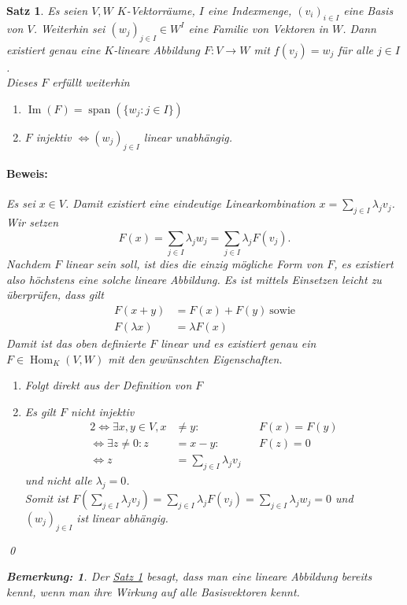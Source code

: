 \documentclass{report}
\newcommand{\lb}{\lambda}
\DeclareMathOperator{\Span}{span}
\DeclareMathOperator{\Hom}{Hom}
\DeclareMathOperator{\Ima}{Im}
\theoremstyle{customrem}
\newtheorem*{bemerkung}{Bemerkung\textnormal:}
\theoremstyle{customdef}
\newtheorem{satz}[definition]{Satz}
\renewenvironment{proof}{\paragraph{Beweis: }}{\qed}
\theoremstyle{customenv}
\begin{document}
	\begin{satz}
		\label{satz33}
		Es seien \(V, W\) \(K\)-Vektorräume, \(I\) eine Indexmenge, \((v_i)_{i \in I}\) eine Basis von \(V\). Weiterhin sei \((w_j)_{j \in I} \in W^I\) eine Familie von Vektoren in \(W\). Dann existiert genau eine \(K\)-lineare Abbildung \(F : V \to W\) mit \(f(v_j) = w_j\) für alle \(j \in I\).\\
		
		 Dieses \(F\) erfüllt weiterhin
		\begin{enumerate}[leftmargin = 4cm]
			\item \(\Ima(F) = \Span(\{w_j : j \in I\})\)
			\item \(F\) injektiv \(\iff (w_j)_{j \in I}\) linear unabhängig.
		\end{enumerate}
		
		\begin{proof}
			Es sei \(x \in V\). Damit existiert eine eindeutige Linearkombination \(x = \sum_{j \in I} \lb_j v_j\). Wir setzen \[F(x) = \sum_{j \in I}\lb_jw_j = \sum_{j \in I} \lb_jF(v_j).\] Nachdem \(F\) linear sein soll, ist dies die einzig mögliche Form von \(F\), es existiert also höchstens eine solche lineare Abbildung. Es ist mittels Einsetzen leicht zu überprüfen, dass gilt
			\begin{align*}
			F(x + y) &= F(x) + F(y)\ \text{sowie}\\
			F(\lb x) &= \lb F(x)
			\end{align*}
			Damit ist das oben definierte \(F\) linear und es existiert genau ein \(F \in \Hom_K(V, W)\) mit den gewünschten Eigenschaften.
			\begin{enumerate}[leftmargin=2cm]
				\item[Zu 1.:]Folgt direkt aus der Definition von \(F\)
				\item[Zu 2.:]Es gilt \(F\) nicht injektiv 
				\begin{alignat*}{2}
				\iff \exists x, y \in V, x &\neq y : && F(x) = F(y)\\
				\iff \exists z \neq 0 : z &= x - y : && F(z) = 0\\
				\iff z &= \sum_{j \in I} \lb_j v_j
				\end{alignat*}
				und nicht alle \(\lb_j = 0\).\\
				Somit ist \(F\left(\sum_{j \in I}\lb_j v_j\right) = \sum_{j \in I} \lb_j F(v_j) = \sum_{j \in I} \lb_j w_j = 0\) und \((w_j)_{j \in I}\) ist linear abhängig.\\
			\end{enumerate}
		\end{proof}
		
		\begin{bemerkung}
			Der \hyperref[satz33]{Satz \ref*{satz33}} besagt, dass man eine lineare Abbildung bereits kennt, wenn man ihre Wirkung auf alle Basisvektoren kennt. 
		\end{bemerkung}
	\end{satz}
	
\end{document}
